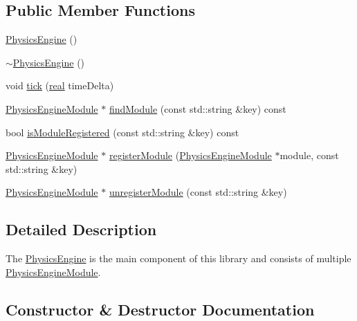 \subsection*{Public Member Functions}
\begin{DoxyCompactItemize}
\item 
\mbox{\hyperlink{classrum_1_1_physics_engine_a9085eaf9e3fc5f840dbc10c1574028a4}{Physics\+Engine}} ()
\item 
\mbox{\hyperlink{classrum_1_1_physics_engine_ad88a3f6114a8851c682de8b3c09c8da8}{$\sim$\+Physics\+Engine}} ()
\item 
void \mbox{\hyperlink{classrum_1_1_physics_engine_a9e91e1e4d63b67c134f39eff6750b728}{tick}} (\mbox{\hyperlink{namespacerum_a7e8cca23573d5eaead0f138cbaa4862c}{real}} time\+Delta)
\item 
\mbox{\hyperlink{classrum_1_1_physics_engine_module}{Physics\+Engine\+Module}} $\ast$ \mbox{\hyperlink{classrum_1_1_physics_engine_a6f7576c08977338be44f39789179a19d}{find\+Module}} (const std\+::string \&key) const
\item 
bool \mbox{\hyperlink{classrum_1_1_physics_engine_a55c3e6247c7ccfdda4c2c2a6c30b5288}{is\+Module\+Registered}} (const std\+::string \&key) const
\item 
\mbox{\hyperlink{classrum_1_1_physics_engine_module}{Physics\+Engine\+Module}} $\ast$ \mbox{\hyperlink{classrum_1_1_physics_engine_a00dea33ce045830e254e3c4c236593ed}{register\+Module}} (\mbox{\hyperlink{classrum_1_1_physics_engine_module}{Physics\+Engine\+Module}} $\ast$module, const std\+::string \&key)
\item 
\mbox{\hyperlink{classrum_1_1_physics_engine_module}{Physics\+Engine\+Module}} $\ast$ \mbox{\hyperlink{classrum_1_1_physics_engine_a3373c0c8052f75a2b6c584bceb96bd25}{unregister\+Module}} (const std\+::string \&key)
\end{DoxyCompactItemize}


\subsection{Detailed Description}
The \mbox{\hyperlink{classrum_1_1_physics_engine}{Physics\+Engine}} is the main component of this library and consists of multiple \mbox{\hyperlink{classrum_1_1_physics_engine_module}{Physics\+Engine\+Module}}. 

\subsection{Constructor \& Destructor Documentation}
\mbox{\label{classrum_1_1_physics_engine_a9085eaf9e3fc5f840dbc10c1574028a4}} 
